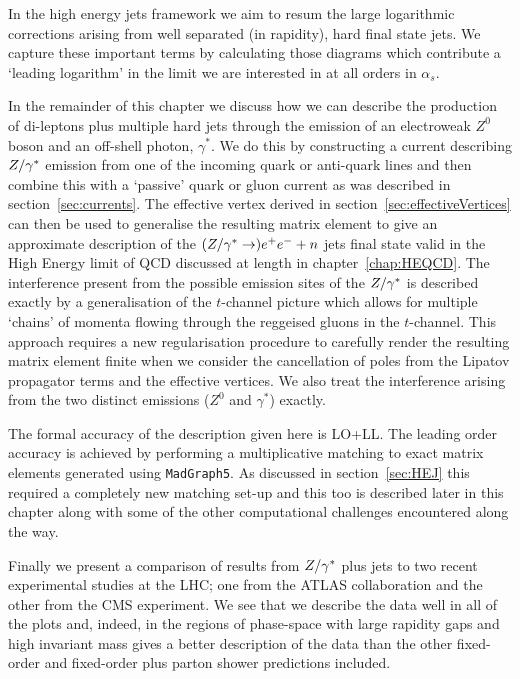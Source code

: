 	In the high energy jets framework we aim to resum the large logarithmic corrections
	arising from well separated (in rapidity), hard final state jets.  We capture these
	important terms by calculating those
	diagrams which contribute a `leading logarithm' in the limit we are interested in
	at all orders in $\alpha_s$.

	In the remainder of this chapter we discuss how we can describe the production
	of di-leptons plus multiple hard jets through the emission of an electroweak $Z^0$
	boson and an off-shell photon, $\gamma^*$.  We do this by constructing a current
	describing $Z/\gamma^*$ emission from one of the incoming quark or anti-quark lines and
	then combine this with a `passive' quark or gluon current as was described in
	section~\ref{sec:currents}.  The effective vertex derived in section~\ref{sec:effectiveVertices}
	can then be used to generalise the resulting matrix element to give an approximate
	description of the $(Z/\gamma^*\to)e^+e^- + n$ jets final state valid in the High Energy
	limit of QCD discussed at length in chapter~\ref{chap:HEQCD}.  The interference
	present from the possible emission sites of the $Z/\gamma^*$ is described exactly by a
	generalisation of the $t$-channel picture which allows for multiple `chains' of
	momenta flowing through the reggeised gluons in the $t$-channel.  This approach
	requires a new regularisation procedure to carefully render the resulting
	matrix element finite when we consider the cancellation of poles from the Lipatov
	propagator terms and the effective vertices.  We also treat the interference arising
	from the two distinct emissions ($Z^0$ and $\gamma^*$) exactly.

	The formal accuracy of the description given here is LO+LL.  The leading order
	accuracy is achieved by performing a multiplicative matching to exact matrix
	elements generated using \texttt{MadGraph5}.  As discussed in section~\ref{sec:HEJ}
	this required a completely new matching set-up and this too is described later in
	this chapter along with some of the other computational challenges encountered
	along the way.

	Finally we present a comparison of results from \hej $Z/\gamma^*$ plus jets to two recent
	experimental studies at the LHC; one from the ATLAS collaboration and the other
	from the CMS experiment.  We see that we describe the data well in all of the plots
	and, indeed, in the regions of phase-space with large rapidity gaps and high invariant
	mass \hej gives a better description of the data than the other fixed-order and
	fixed-order plus parton shower predictions included.

